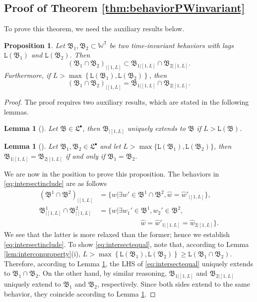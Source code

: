 \documentclass[11pt,print,draftcls,onecolumn,romanappendices]{ieeecolor}
\newtheorem{prop}[thm]{Proposition}
\newtheorem{lem}[thm]{Lemma}
\newcommand{\W}{\mathbb{W}}
\newcommand{\T}{\mathbb{T}}
\newcommand{\LTI}[1]{\mathfrak{L}^{#1}}
\newcommand{\lag}[1]{\mathtt{L}\left(#1\right)}
\newcommand{\B}{\mathfrak{B}}
\newcommand{\bint}[1]{{|[#1]}}
\begin{document}
\subsection{Proof of Theorem \ref{thm:behaviorPWinvariant}}\label{appx:proofthm:behaviorPWinvariant}
To prove this theorem, we need the auxiliary results below.
\begin{prop}\label{prop:truncintersect}
	Let $\B_1,\B_2\subset\W^\T$ be two time-invariant behaviors with lags $\lag{\B_1}$ and $\lag{\B_2}$. Then
	\begin{equation}\label{eq:intersectinclude}
		\left(\B_1\cap\B_2\right)_{\bint{1,L}}\subset\B_{1\bint{1,L}}\cap\B_{2\bint{1,L}}.
	\end{equation}
	Furthermore, if $L>\max\left\{\lag{\B_1},\lag{\B_2}\right\}$, then
	\begin{equation}\label{eq:intersectequal}
		\left(\B_1\cap\B_2\right)_{\bint{1,L}}=\B_{1\bint{1,L}}\cap\B_{2\bint{1,L}}.
	\end{equation}
\end{prop}
\begin{proof}
	The proof requires two auxiliary results, which are stated in the following lemmas.
	\begin{lem}[\cite{Markovsky:2020}]\label{lem:truncextension}
		Let $\B\in\LTI{\bullet}$, then $\B_\bint{1,L}$ uniquely extends to $\B$ if $L>\lag{\B}$.
	\end{lem}
	\begin{lem}[\cite{Markovsky:2020}]\label{lem:truncagree}
		Let $\B_1,\B_2\in\LTI{\bullet}$ and let $L>\max\{\lag{\B_1},\lag{\B_2}\}$, then $\B_{1\bint{1,L}}=\B_{2\bint{1,L}}$ if and only if $\B_1=\B_2$.
	\end{lem}
	We are now in the position to prove this proposition. The behaviors in \eqref{eq:intersectinclude} are as follows
	\begin{align*}
		\left(\mathfrak{B}^1\cap\mathfrak{B}^2\right)_{|[1,L]}&=\bigl\{w|\exists w'\in \mathfrak{B}^1\cap\mathfrak{B}^2, \hat{w}=\hat{w}'_\bint{1,L}\bigr\},\\
		\mathfrak{B}^1_{|[1,L]}\cap\mathfrak{B}^2_{|[1,L]}&=\bigl\{w|\exists w_1'\in \mathfrak{B}^1, w_2'\in \mathfrak{B}^2,\\
		&\qquad\qquad\qquad\hat{w}=\hat{w}'_{1\bint{1,L}}=\hat{w}_{2\bint{1,L}}\bigr\}.
	\end{align*}
	We see that the latter is more relaxed than the former; hence we establish \eqref{eq:intersectinclude}. To show \eqref{eq:intersectequal}, note that, according to Lemma \ref{lem:interconproperty}(i), $L>\max\left\{\lag{\B_1},\lag{\B_2}\right\}\geq\lag{\B_1\cap\B_2}$. Therefore, according to Lemma \ref{lem:truncextension}, the LHS of \eqref{eq:intersectequal} uniquely extends to $\B_1\cap\B_2$. On the other hand, by similar reasoning, $\B_{1\bint{1,L}}$ and $\B_{2\bint{1,L}}$ uniquely extend to $\B_1$ and $\B_2$, respectively. Since both sides extend to the same behavior, they coincide according to Lemma \ref{lem:truncagree}. 
\end{proof}
\end{document}
